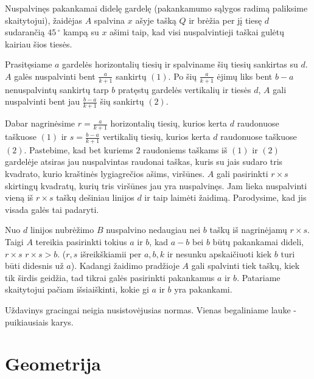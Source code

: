 \begin{enumerate}
Nuspalvinęs pakankamai didelę gardelę (pakankamumo sąlygos radimą
paliksime skaitytojui), žaidėjas $A$ spalvina $x$ ašyje tašką $Q$ ir brėžia per
jį tiesę $d$ sudarančią $45\,^{\circ}$  kampą su $x$ ašimi taip, kad visi
nuspalvintieji taškai gulėtų kairiau šios tiesės.

Prasitęsiame $a$ gardelės horizontalių tiesių ir spalviname šių tiesių
sankirtas su $d$. $A$ galės nuspalvinti bent $ \frac{a}{k+1} $ sankirtų
$(1)$.  Po šių  $ \frac{a}{k+1} $ ėjimų liks bent $b-a$ nenuspalvintų
sankirtų tarp $b$ pratęstų gardelės vertikalių  ir tiesės $d$, $A$ gali
nuspalvinti bent jau $ \frac{b-a}{k+1} $ šių sankirtų $(2)$. 

Dabar nagrinėsime $r= \frac{a}{k+1} $ horizontalių tiesių, kurios kerta
$d$ raudonuose taškuose $(1)$ ir $s= \frac{b-a}{k+1} $ vertikalių tiesių,
kurios kerta $d$ raudonuose taškuose $(2)$. Pastebime, kad bet kuriems $2$
raudoniems taškams iš $(1)$ ir $(2)$ gardelėje atsiras jau nuspalvintas
raudonai taškas, kuris su jais sudaro tris kvadrato, kurio kraštinės
lygiagrečios ašims, viršūnes. $A$ gali pasirinkti  $ r\times s $ skirtingų
kvadratų, kurių tris viršūnes jau yra nuspalvinęs. Jam lieka nuspalvinti
vieną iš  $  r\times s $ taškų dešiniau linijos $d$ ir taip laimėti
žaidimą. Parodysime, kad jis visada galės tai padaryti.

Nuo $d$ linijos nubrėžimo $B$ nuspalvino nedaugiau nei $b$ taškų iš
nagrinėjamų $ r\times s $. Taigi $A$ tereikia pasirinkti tokius $a$ ir
$b$, kad $a-b$ bei $b$ būtų pakankamai dideli, $ r\times s $ $r\times s >
b$. ($r,s$ išreikškiamii per $a,b,k$ ir nesunku apskaičiuoti kiek $b$ turi
būti didesnis už $a$). Kadangi žaidimo pradžioje $A$ gali spalvinti tiek
taškų, kiek tik širdis geidžia, tad tikrai galės pasirinkti pakankamus $a$
ir $b$. Patariame skaitytojui pačiam išsiaiškinti, kokie gi $a$ ir $b$ yra
pakankami.

Uždavinys gracingai neigia nusistovėjusias normas. Vienas begaliniame
lauke - puikiausiais karys.
\end{enumerate} 
\section*{Geometrija}
